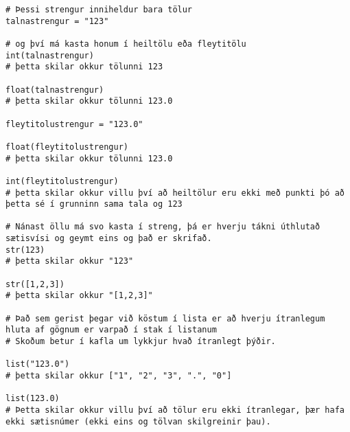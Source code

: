 \begin{lstlisting}[caption=Hvernig á að kasta á milli gagnataga, label=lst:kast]
# Þessi strengur inniheldur bara tölur
talnastrengur = "123"

# og því má kasta honum í heiltölu eða fleytitölu
int(talnastrengur)
# þetta skilar okkur tölunni 123

float(talnastrengur)
# þetta skilar okkur tölunni 123.0

fleytitolustrengur = "123.0"

float(fleytitolustrengur) 
# þetta skilar okkur tölunni 123.0

int(fleytitolustrengur)
# þetta skilar okkur villu því að heiltölur eru ekki með punkti þó að þetta sé í grunninn sama tala og 123

# Nánast öllu má svo kasta í streng, þá er hverju tákni úthlutað sætisvísi og geymt eins og það er skrifað.
str(123)
# þetta skilar okkur "123"

str([1,2,3])
# þetta skilar okkur "[1,2,3]"

# Það sem gerist þegar við köstum í lista er að hverju ítranlegum hluta af gögnum er varpað í stak í listanum
# Skoðum betur í kafla um lykkjur hvað ítranlegt þýðir.

list("123.0")
# þetta skilar okkur ["1", "2", "3", ".", "0"]

list(123.0)
# Þetta skilar okkur villu því að tölur eru ekki ítranlegar, þær hafa ekki sætisnúmer (ekki eins og tölvan skilgreinir þau). 
\end{lstlisting}